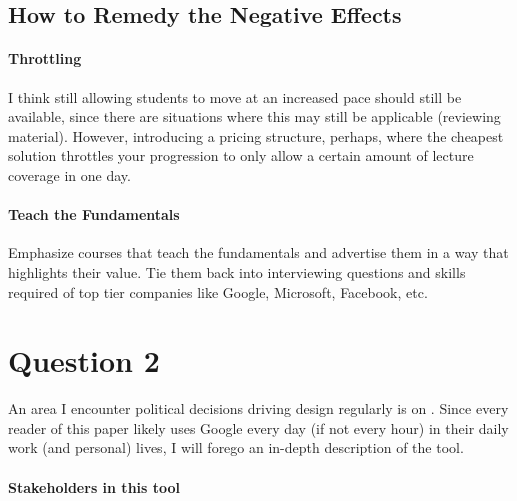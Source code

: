 \subsection{How to Remedy the Negative Effects}

\paragraph{Throttling}
I think still allowing students to move at an increased pace should still be available, since there are situations where this may still be applicable (reviewing material). However, introducing a pricing structure, perhaps, where the cheapest solution throttles your progression to only allow a certain amount of lecture coverage in one day.

\paragraph{Teach the Fundamentals}
Emphasize courses that teach the fundamentals and advertise them in a way that highlights their value. Tie them back into interviewing questions and skills required of top tier companies like Google, Microsoft, Facebook, etc.

\section{Question 2}

An area I encounter political decisions driving design regularly is on . Since every reader of this paper likely uses Google every day (if not every hour) in their daily work (and personal) lives, I will forego an in-depth description of the tool.

\paragraph{Stakeholders in this tool}

